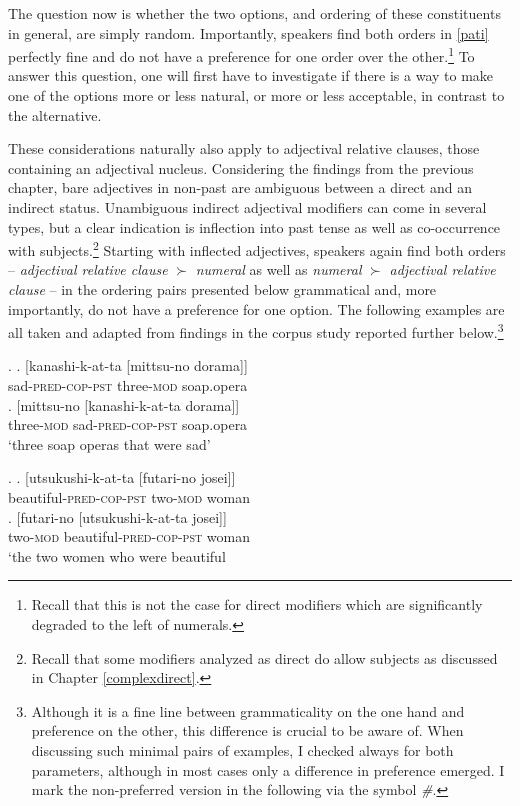 \documentclass [output=book,colorlinks,citecolor=brown]{langscibook}
\begin{document}
The question now is whether the two options, and ordering of these constituents in general, are simply random. Importantly, speakers find both orders in \ref{pati} perfectly fine and do not have a preference for one order over the other.\footnote{Recall that this is not the case for direct modifiers which are significantly degraded to the left of numerals.} To answer this question, one will first have to investigate if there is a way to make one of the options more or less natural, or more or less acceptable, in contrast to the alternative. %

These considerations naturally also apply to adjectival relative clauses, those containing an adjectival nucleus. Considering the findings from the previous chapter, bare adjectives in non-past are ambiguous between a direct and an indirect status. Unambiguous indirect adjectival modifiers can come in several types, but a clear indication is inflection into past tense as well as co-occurrence with subjects.\footnote{Recall that some modifiers analyzed as direct do allow subjects as discussed in Chapter \ref{complexdirect}.} Starting with inflected adjectives, speakers again find both orders -- \textit{adjectival relative clause} $\succ$ \textit{numeral} as well as \textit{numeral} $\succ$ \textit{adjectival relative clause} -- in the ordering pairs presented below grammatical and, more importantly, do not have a preference for one option. The following examples are all taken and adapted from findings in the corpus study reported further below.\footnote{Although it is a fine line between grammaticality on the one hand and preference on the other, this difference is crucial to be aware of. When discussing such minimal pairs of examples, I checked always for both parameters, although in most cases only a difference in preference emerged. I mark the non-preferred version in the following via the symbol \textit{\#}.} %

\newpage

\ex. \label{kanashikatta} \ag. [kanashi-k-at-ta [mittsu-no dorama]]\\
sad-\textsc{pred-cop-pst} three-\textsc{mod} soap.opera\\
\bg. [mittsu-no [kanashi-k-at-ta dorama]]\\
three-\textsc{mod} sad-\textsc{pred-cop-pst} soap.opera\\
`three soap operas that were sad' \label{soapoperajapanese}

\ex. \label{kanashikattafutari} \ag. [utsukushi-k-at-ta [futari-no josei]]\\
beautiful-\textsc{pred-cop-pst} two-\textsc{mod} woman\\
\bg. [futari-no [utsukushi-k-at-ta josei]]\\
two-\textsc{mod} beautiful-\textsc{pred-cop-pst} woman\\
`the two women who were beautiful
\end{document}
